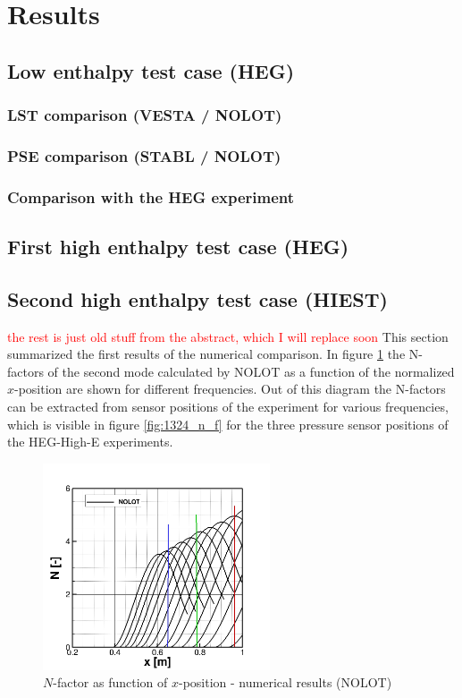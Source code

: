 \documentclass[]{aiaa-tc}%
\begin{document}
\section{Results}\label{sect:results}

\subsection{Low enthalpy test case (HEG)}\label{sect:low_enthalpy}

\subsubsection{LST comparison (VESTA / NOLOT)}
\subsubsection{PSE comparison (STABL / NOLOT)}
\subsubsection{Comparison with the HEG experiment}

\subsection{First high enthalpy test case (HEG)}\label{sect:high_enthalpy}

\subsection{Second high enthalpy test case (HIEST)}\label{sect:high_enthalpy}

\textcolor{red}{the rest is just old stuff from the abstract, which I will replace soon}
This section summarized the first results of the numerical comparison. In figure \ref{fig:1324_n_x} the N-factors of the second mode calculated by NOLOT as a function of the normalized $x$-position are shown for different frequencies. Out of this diagram the N-factors can be extracted from sensor positions of the experiment for various frequencies, which is visible in figure \ref{fig:1324_n_f} for the three pressure sensor positions of the HEG-High-E experiments. 

\begin{figure}[htbp]
	\centering
\includegraphics[width=0.6\textwidth]{pics/2018_1324_nolot_n_x.jpg}
	\caption{$N$-factor as function of $x$-position - numerical results (NOLOT)}
	\label{fig:1324_n_x}
\end{figure}
\end{document}
